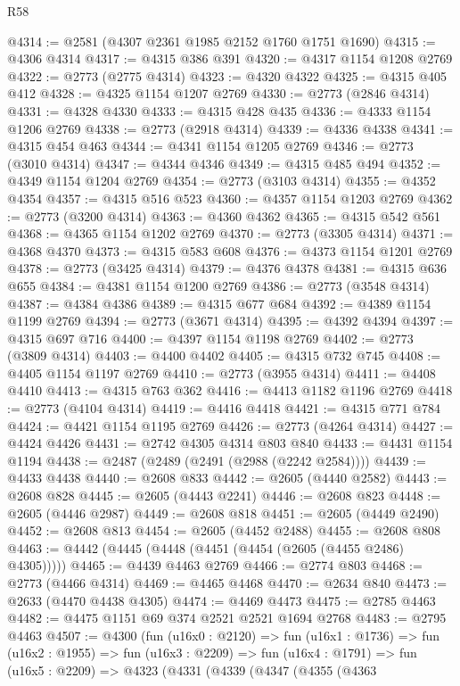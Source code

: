 \begin{lexlean}{R58}
\begin{coremodule}
@4314 := @2581 (@4307 @2361 @1985 @2152 @1760 @1751 @1690)
@4315 := @4306 @4314
@4317 := @4315 @386 @391
@4320 := @4317 @1154 @1208 @2769
@4322 := @2773 (@2775 @4314)
@4323 := @4320 @4322
@4325 := @4315 @405 @412
@4328 := @4325 @1154 @1207 @2769
@4330 := @2773 (@2846 @4314)
@4331 := @4328 @4330
@4333 := @4315 @428 @435
@4336 := @4333 @1154 @1206 @2769
@4338 := @2773 (@2918 @4314)
@4339 := @4336 @4338
@4341 := @4315 @454 @463
@4344 := @4341 @1154 @1205 @2769
@4346 := @2773 (@3010 @4314)
@4347 := @4344 @4346
@4349 := @4315 @485 @494
@4352 := @4349 @1154 @1204 @2769
@4354 := @2773 (@3103 @4314)
@4355 := @4352 @4354
@4357 := @4315 @516 @523
@4360 := @4357 @1154 @1203 @2769
@4362 := @2773 (@3200 @4314)
@4363 := @4360 @4362
@4365 := @4315 @542 @561
@4368 := @4365 @1154 @1202 @2769
@4370 := @2773 (@3305 @4314)
@4371 := @4368 @4370
@4373 := @4315 @583 @608
@4376 := @4373 @1154 @1201 @2769
@4378 := @2773 (@3425 @4314)
@4379 := @4376 @4378
@4381 := @4315 @636 @655
@4384 := @4381 @1154 @1200 @2769
@4386 := @2773 (@3548 @4314)
@4387 := @4384 @4386
@4389 := @4315 @677 @684
@4392 := @4389 @1154 @1199 @2769
@4394 := @2773 (@3671 @4314)
@4395 := @4392 @4394
@4397 := @4315 @697 @716
@4400 := @4397 @1154 @1198 @2769
@4402 := @2773 (@3809 @4314)
@4403 := @4400 @4402
@4405 := @4315 @732 @745
@4408 := @4405 @1154 @1197 @2769
@4410 := @2773 (@3955 @4314)
@4411 := @4408 @4410
@4413 := @4315 @763 @362
@4416 := @4413 @1182 @1196 @2769
@4418 := @2773 (@4104 @4314)
@4419 := @4416 @4418
@4421 := @4315 @771 @784
@4424 := @4421 @1154 @1195 @2769
@4426 := @2773 (@4264 @4314)
@4427 := @4424 @4426
@4431 := @2742 @4305 @4314 @803 @840
@4433 := @4431 @1154 @1194
@4438 := @2487 (@2489 (@2491 (@2988 (@2242 @2584))))
@4439 := @4433 @4438
@4440 := @2608 @833
@4442 := @2605 (@4440 @2582)
@4443 := @2608 @828
@4445 := @2605 (@4443 @2241)
@4446 := @2608 @823
@4448 := @2605 (@4446 @2987)
@4449 := @2608 @818
@4451 := @2605 (@4449 @2490)
@4452 := @2608 @813
@4454 := @2605 (@4452 @2488)
@4455 := @2608 @808
@4463 := @4442 (@4445 (@4448 (@4451 (@4454 (@2605 (@4455 @2486) @4305)))))
@4465 := @4439 @4463 @2769
@4466 := @2774 @803
@4468 := @2773 (@4466 @4314)
@4469 := @4465 @4468
@4470 := @2634 @840
@4473 := @2633 (@4470 @4438 @4305)
@4474 := @4469 @4473
@4475 := @2785 @4463
@4482 := @4475 @1151 @69 @374 @2521 @2521 @1694 @2768
@4483 := @2795 @4463
@4507 := @4300
    (fun (u16x0 : @2120) =>
    fun (u16x1 : @1736) =>
    fun (u16x2 : @1955) =>
    fun (u16x3 : @2209) =>
    fun (u16x4 : @1791) =>
    fun (u16x5 : @2209) =>
    @4323
      (@4331
        (@4339
          (@4347
            (@4355
              (@4363

\end{coremodule}
\end{lexlean}
